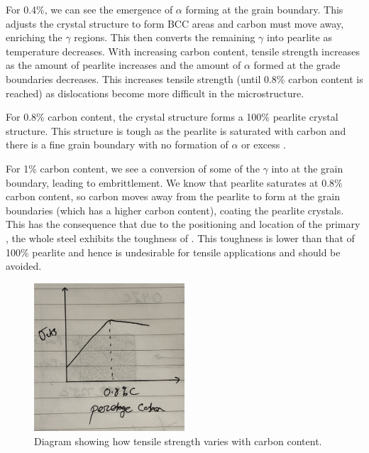 \documentclass[11pt]{article}
\begin{document}
For 0.4\%, we can see the emergence of $\alpha$ forming at the grain boundary. This adjusts the crystal structure to form BCC areas and carbon must move away, enriching the $\gamma$ regions. This then converts the remaining $\gamma$ into pearlite as temperature decreases. With increasing carbon content, tensile strength increases as the amount of pearlite increases and the amount of $\alpha$ formed at the grade boundaries decreases. This increases tensile strength (until 0.8\% carbon content is reached) as dislocations become more difficult in the microstructure. 

For 0.8\% carbon content, the crystal structure forms a 100\% pearlite crystal structure. This structure is tough as the pearlite is saturated with carbon and there is a fine grain boundary with no formation of $\alpha$ or excess .

For 1\% carbon content, we see a conversion of some of the $\gamma$ into  at the grain boundary, leading to embrittlement. We know that pearlite saturates at 0.8\% carbon content, so carbon moves away from the pearlite to form  at the grain boundaries (which has a higher carbon content), coating the pearlite crystals. This has the consequence that due to the positioning and location of the primary , the whole steel exhibits the toughness of . This toughness is lower than that of 100\% pearlite and hence is undesirable for tensile applications and should be avoided. 
\begin{figure}[H]
    \centering
    \includegraphics[width = 0.5\textwidth]{./img/q1c.jpg}
    \caption{Diagram showing how tensile strength varies with carbon content.}
\end{figure}
\end{document}

